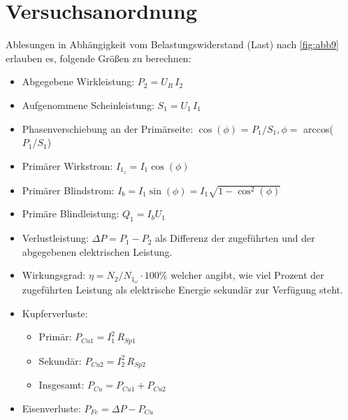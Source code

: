 \documentclass[11pt,ngerman]{scrartcl}
\begin{document}
\newpage

\section{Versuchsanordnung \cite{vorlagetrafo}}\label{sec:Versuchsanordnung}

Ablesungen in Abhängigkeit vom Belastungswiderstand (Last) nach \autoref{fig:abb9} erlauben es, folgende
Größen zu berechnen:

\begin{itemize}

	\item Abgegebene Wirkleistung: $P_2 = U_R\,I_2$

	\item Aufgenommene Scheinleistung: $S_1 = U_1\,I_1$

	\item Phasenverschiebung an der Primärseite: $\cos{(\phi)}$ = $P_1 / S_1, \phi = $ arccos($P_1 / S_1$)

	\item Primärer Wirkstrom: $I_{1_z} = I_1 \cos{(\phi)}$

	\item Primärer Blindstrom: $I_b = I_1 \sin{(\phi)} = I_1 \sqrt{1 - \cos^2(\phi)}$

	\item Primäre Blindleistung: $Q_1 = I_b U_1$

	\item Verlustleistung: $\Delta P = P_1 - P_2$ als Differenz der zugeführten und der abgegebenen elektrischen Leistung.

	\item Wirkungsgrad: $\eta = N_2 / N_{1_{\omega}} \cdot 100\%$ welcher angibt, wie viel Prozent der zugeführten Leistung als elektrische Energie sekundär zur Verfügung steht.

	\item Kupferverluste:

	      \begin{itemize}

		      \item Primär: $P_{Cu1} = I_1^2 \, R_{Sp1}$

		      \item Sekundär: $P_{Cu2} = I_2^2 \, R_{Sp2}$

		      \item Insgesamt: $P_{Cu} = P_{Cu1} + P_{Cu2}$

	      \end{itemize}

	\item Eisenverluste: $P_{Fe} = \Delta P - P_{Cu}$

\end{itemize}
\end{document}
